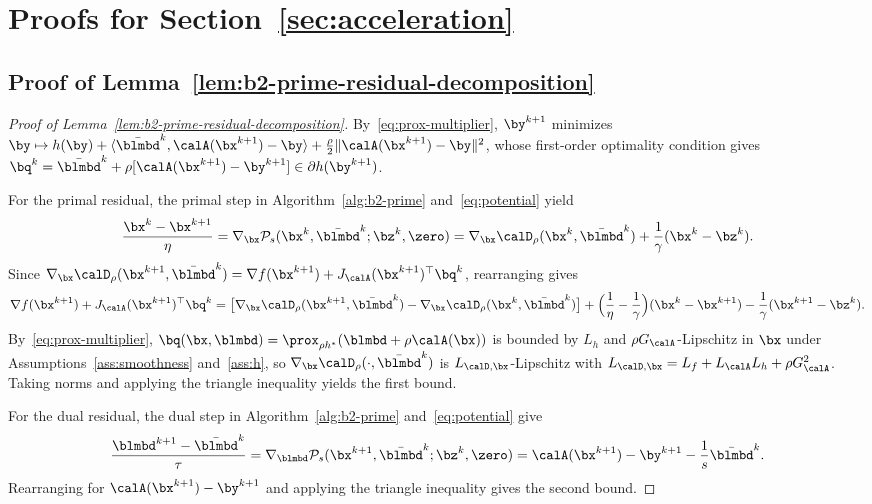 \section{Proofs for Section~\ref{sec:acceleration}}
\label{app:acceleration}

\subsection{Proof of Lemma~\ref{lem:b2-prime-residual-decomposition}}
\label{app:b2-prime-residual-decomposition}

\begin{proof}[Proof of Lemma~\ref{lem:b2-prime-residual-decomposition}]
By~\eqref{eq:prox-multiplier}, \(\by^{k+1}\) minimizes
\(\by\mapsto h(\by)+\langle\bar{\blmbd}^k,\calA(\bx^{k+1})-\by\rangle
+\frac{\rho}{2}\|\calA(\bx^{k+1})-\by\|^2\), whose first-order optimality
condition gives \(\bq^k=\bar{\blmbd}^k+\rho[\calA(\bx^{k+1})-\by^{k+1}]\in\partial h(\by^{k+1})\).

For the primal residual, the primal step in Algorithm~\ref{alg:b2-prime} and~\eqref{eq:potential} yield
\[
    \frac{\bx^k-\bx^{k+1}}{\eta}
    =\nabla_{\bx}\mathcal P_s(\bx^k,\bar{\blmbd}^k;\bz^k,\zero)
    =\nabla_{\bx}\calD_\rho(\bx^k,\bar{\blmbd}^k)+\frac{1}{\gamma}(\bx^k-\bz^k).
\]
Since \(\nabla_{\bx}\calD_\rho(\bx^{k+1},\bar{\blmbd}^k)
=\nabla f(\bx^{k+1})+J_{\calA}(\bx^{k+1})^\top\bq^k\), rearranging gives
\[
    \nabla f(\bx^{k+1})+J_{\calA}(\bx^{k+1})^\top\bq^k
    =\bigl[\nabla_{\bx}\calD_\rho(\bx^{k+1},\bar{\blmbd}^k)
    -\nabla_{\bx}\calD_\rho(\bx^k,\bar{\blmbd}^k)\bigr]
    +\Bigl(\frac{1}{\eta}-\frac{1}{\gamma}\Bigr)(\bx^k-\bx^{k+1})
    -\frac{1}{\gamma}(\bx^{k+1}-\bz^k).
\]
By~\eqref{eq:prox-multiplier}, \(\bq(\bx,\blmbd)=\prox_{\rho h^*}(\blmbd+\rho\calA(\bx))\)
is bounded by \(L_h\) and \(\rho G_{\calA}\)-Lipschitz in \(\bx\) under
Assumptions~\ref{ass:smoothness} and~\ref{ass:h}, so
\(\nabla_{\bx}\calD_\rho(\cdot,\bar{\blmbd}^k)\) is
\(L_{\calD,\bx}\)-Lipschitz with \(L_{\calD,\bx}=L_f+L_{\calA}L_h+\rho G_{\calA}^2\).
Taking norms and applying the triangle inequality yields the first bound.

For the dual residual, the dual step in Algorithm~\ref{alg:b2-prime} and~\eqref{eq:potential} give
\[
    \frac{\blmbd^{k+1}-\bar{\blmbd}^k}{\tau}
    =\nabla_{\blmbd}\mathcal P_s(\bx^{k+1},\bar{\blmbd}^k;\bz^k,\zero)
    =\calA(\bx^{k+1})-\by^{k+1}-\frac{1}{s}\bar{\blmbd}^k.
\]
Rearranging for \(\calA(\bx^{k+1})-\by^{k+1}\) and applying the triangle inequality
gives the second bound.
\end{proof}

